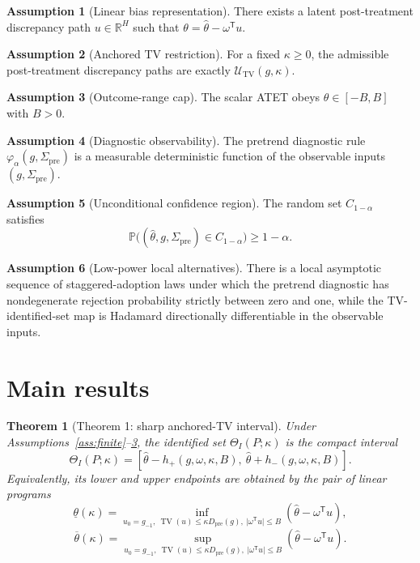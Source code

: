 \documentclass[11pt]{article}
\renewcommand{\Pr}{\mathbb{P}}
\newcommand{\transpose}{\mathsf{T}}
\newcommand{\R}{\mathbb{R}}
\theoremstyle{definition}
\newtheorem{assumption}{Assumption}
\theoremstyle{plain}
\newtheorem{theorem}{Theorem}
\theoremstyle{remark}
\begin{document}
\begin{assumption}[Linear bias representation]\label{ass:linear}
There exists a latent post-treatment discrepancy path \(u\in\R^H\) such that
\(\theta=\hat\theta-\omega^\transpose u\).
\end{assumption}

\begin{assumption}[Anchored TV restriction]\label{ass:tv}
For a fixed \(\kappa\ge 0\), the admissible post-treatment discrepancy paths are exactly \(\mathcal U_{\mathrm{TV}}(g,\kappa)\).
\end{assumption}

\begin{assumption}[Outcome-range cap]\label{ass:range}
The scalar ATET obeys \(\theta\in[-B,B]\) with \(B>0\).
\end{assumption}

\begin{assumption}[Diagnostic observability]\label{ass:test}
The pretrend diagnostic rule \(\varphi_\alpha(g,\Sigma_{\mathrm{pre}})\) is a measurable deterministic function of the observable inputs \((g,\Sigma_{\mathrm{pre}})\).
\end{assumption}

\begin{assumption}[Unconditional confidence region]\label{ass:conf}
The random set \(C_{1-\alpha}\) satisfies
\[
\Pr\bigl((\hat\theta,g,\Sigma_{\mathrm{pre}})\in C_{1-\alpha}\bigr)\ge 1-\alpha .
\]
\end{assumption}

\begin{assumption}[Low-power local alternatives]\label{ass:local}
There is a local asymptotic sequence of staggered-adoption laws under which the pretrend diagnostic has nondegenerate rejection probability strictly between zero and one, while the TV-identified-set map is Hadamard directionally differentiable in the observable inputs.
\end{assumption}

\section{Main results}
\begin{theorem}[Theorem 1: sharp anchored-TV interval]\label{thm:sharp}
Under Assumptions~\ref{ass:finite}--\ref{ass:range}, the identified set
\(\Theta_I(P;\kappa)\) is the compact interval
\[
\Theta_I(P;\kappa)
=
[\hat\theta-h_{+}(g,\omega,\kappa,B),\ \hat\theta+h_{-}(g,\omega,\kappa,B)].
\]
Equivalently, its lower and upper endpoints are obtained by the pair of linear programs
\[
\underline\theta(\kappa)
=
\inf_{u_0=g_{-1},\ \operatorname{TV}(u)\le \kappa D_{\mathrm{pre}}(g),\ \lvert \omega^\transpose u\rvert\le B}
(\hat\theta-\omega^\transpose u),
\]
\[
\overline\theta(\kappa)
=
\sup_{u_0=g_{-1},\ \operatorname{TV}(u)\le \kappa D_{\mathrm{pre}}(g),\ \lvert \omega^\transpose u\rvert\le B}
(\hat\theta-\omega^\transpose u).
\]
\end{theorem}
\end{document}
